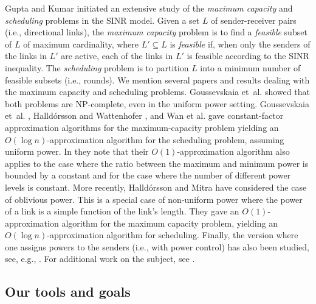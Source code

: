 \documentclass[11pt]{article}
\theoremstyle{remark}
\begin{document}
Gupta and Kumar \cite{GK00} initiated an extensive study of the \emph{maximum capacity} and \emph{scheduling} problems in the SINR model.
Given a set $L$ of sender-receiver pairs (i.e., directional links), the \emph{maximum capacity} problem is to find a \emph{feasible} subset of $L$ of maximum cardinality, where $L' \subseteq L$ is \emph{feasible} if, when only the senders of the links in $L'$ are active, each of the links in $L'$ is feasible according to the SINR inequality. The \emph{scheduling} problem is to partition $L$ into a minimum number of feasible subsets (i.e., rounds).  
We mention several papers and results dealing with the maximum capacity and scheduling problems. 
Goussevskaia et~al. \cite{GOW07} showed that both problems are NP-complete, even in the uniform power setting.  
Goussevskaia et~al. \cite{GHWW09}, Halld{\'o}rsson and Wattenhofer \cite{HW09}, and Wan et al. \cite{WJY09} gave constant-factor approximation algorithms for the maximum-capacity problem yielding an $O(\log n)$-approximation algorithm for the scheduling problem, assuming uniform power. In \cite{GHWW09} they note that their $O(1)$-approximation algorithm also applies to the case where the ratio between the maximum and minimum power is bounded by a constant and for the case where the number of different power levels is constant.
More recently, Halld{\'o}rsson and Mitra \cite{HM11_SODA} have considered the case of oblivious power. This is a special case of non-uniform power where the power of a link is a simple function of the link's length. They gave an $O(1)$-approximation algorithm for the maximum capacity problem, yielding an $O(\log n)$-approximation algorithm for scheduling. 
Finally, the version where one assigns powers to the senders (i.e., with power control) has also been studied, see, e.g., \cite{AD09,MW06,K11,HM11_SODA,H12}.  For additional work on the subject, see \cite{AschnerCK14}.


\subsection{Our tools and goals}
\label{sec:tools}
\end{document}
